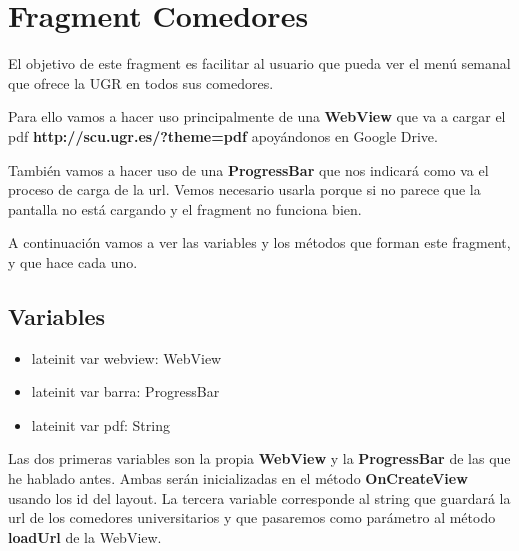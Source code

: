 \section{Fragment Comedores}

\vspace{5 mm}

El objetivo de este fragment es facilitar al usuario que pueda ver el menú semanal que ofrece la UGR en todos sus comedores.

Para ello vamos a hacer uso principalmente de una \textbf{WebView} que va a cargar el pdf \textbf{http://scu.ugr.es/?theme=pdf} apoyándonos en Google Drive.

\vspace{5 mm}

También vamos a hacer uso de una \textbf{ProgressBar} que nos indicará como va el proceso de carga de la url. Vemos necesario usarla porque si no parece que la pantalla no está cargando y el fragment no funciona bien.

\vspace{5 mm}

A continuación vamos a ver las variables y los métodos que forman este fragment, y que hace cada uno.

\vspace{5 mm}

\subsection{Variables}

\vspace{5 mm}

\begin{itemize}

\item{lateinit var webview: WebView}
\item{lateinit var barra: ProgressBar}
\item{lateinit var pdf: String}

\end{itemize}

Las dos primeras variables son la propia \textbf{WebView} y la \textbf{ProgressBar} de las que he hablado antes. Ambas serán inicializadas en el método \textbf{OnCreateView} usando los id del layout.
La tercera variable corresponde al string que guardará la url de los comedores universitarios y que pasaremos como parámetro al método \textbf{loadUrl} de la WebView.

\newpage


